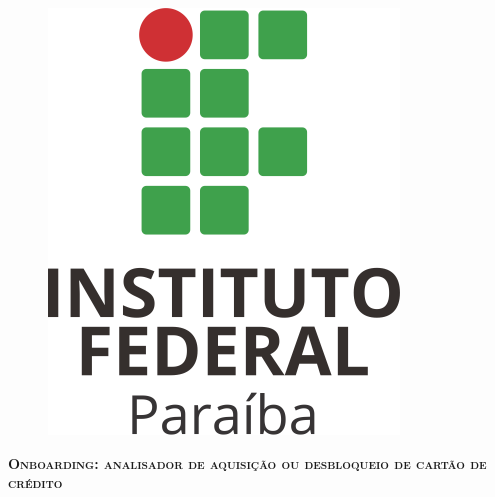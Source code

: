 
\frenchspacing 

\newpage

\pretextual

\begin{capa} 
   \center
   \begin{figure}[htp]
	\centering
	\includegraphics[width = 0.22\linewidth]{imagens/IFPB.png}
\end{figure}
   \ABNTEXchapterfont\large\bfseries{\imprimirinstituicao} 
   \vfill
   \vspace*{2cm}
   \begin{center}
   \ABNTEXchapterfont\Large\bfseries{\MakeUppercase{\imprimirtitulo}}
   \end{center}
  \ABNTEXchapterfont\normalsize\bfseries\textsc{Onboarding: analisador de aquisição ou desbloqueio de cartão de crédito}
   \vfill
   \vfill
    \vspace*{2cm}
   \ABNTEXchapterfont\large\bfseries\textsc{\MakeUppercase{\imprimirautor}}
   \vfill
   \vspace*{4cm}
   \large\bfseries\MakeTextUppercase{\imprimirlocal} \\
   \large\bfseries\imprimirdata
   \vspace*{1cm}
\end{capa}

